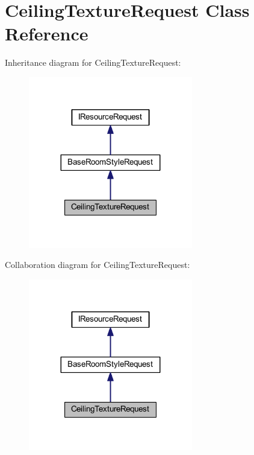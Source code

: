 \hypertarget{class_ceiling_texture_request}{}\section{Ceiling\+Texture\+Request Class Reference}
\label{class_ceiling_texture_request}


Inheritance diagram for Ceiling\+Texture\+Request\+:
\nopagebreak
\begin{figure}[H]
\begin{center}
\leavevmode
\includegraphics[width=203pt]{class_ceiling_texture_request__inherit__graph}
\end{center}
\end{figure}


Collaboration diagram for Ceiling\+Texture\+Request\+:
\nopagebreak
\begin{figure}[H]
\begin{center}
\leavevmode
\includegraphics[width=203pt]{class_ceiling_texture_request__coll__graph}
\end{center}
\end{figure}
